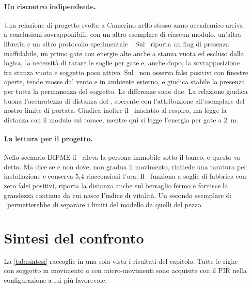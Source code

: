 \paragraph{Un riscontro indipendente.}
\label{sec:ld2420-riscontro}
Una relazione di progetto svolta a Camerino nello stesso anno accademico arriva a
conclusioni sovrapponibili, con un altro esemplare di ciascun modulo, un'altra libreria
e un altro protocollo sperimentale~\cite{dellaquila2026}. Sul \ldc\ riporta un flag di
presenza inaffidabile, un primo gate con energie alte anche a stanza vuota ed escluso
dalla logica, la necessità di tarare le soglie per gate e, anche dopo, la
sovrapposizione fra stanza vuota e soggetto poco attivo. Sul \ldb\ non osserva falsi
positivi con finestre aperte, tende mosse dal vento e in ambiente esterno, e giudica
stabile la presenza per tutta la permanenza del soggetto. Le differenze sono due. La
relazione giudica buona l'accuratezza di distanza del \ldc, coerente con
l'attribuzione all'esemplare del nostro limite di portata. Giudica inoltre il \ldb\
inadatto al respiro, ma legge la distanza con il modulo sul torace, mentre qui si
legge l'energia per gate a 2~m.

\paragraph{La lettura per il progetto.} Nello scenario DIPME il \ldc\ rileva la
persona immobile sotto il banco, e questo va detto. Ma dice se e non dove, non gradua
il movimento, richiede una taratura per installazione e conserva 5,4 riaccensioni
l'ora. Il \ldb\ funziona a soglie di fabbrica con zero falsi positivi, riporta la
distanza anche sul bersaglio fermo e fornisce la grandezza continua da cui nasce
l'indice di vitalità. Un secondo esemplare di \ldc\ permetterebbe di separare i limiti
del modello da quelli del pezzo.

\section{Sintesi del confronto}
\label{sec:discussione}
\label{sec:limiti}

La \cref{tab:sintesi} raccoglie in una sola vista i risultati del capitolo. Tutte le
righe con soggetto in movimento o con micro-movimenti sono acquisite con il PIR nella
configurazione a lui più favorevole.

